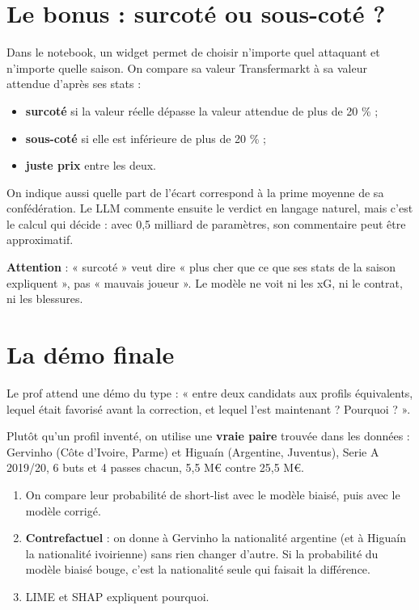\documentclass[11pt,a4paper]{article}
\begin{document}
\section{Le bonus : surcoté ou sous-coté ?}
Dans le notebook, un widget permet de choisir n'importe quel attaquant et n'importe quelle saison. On compare sa valeur Transfermarkt à sa valeur attendue d'après ses stats :
\begin{itemize}
  \item \textbf{surcoté} si la valeur réelle dépasse la valeur attendue de plus de 20 \% ;
  \item \textbf{sous-coté} si elle est inférieure de plus de 20 \% ;
  \item \textbf{juste prix} entre les deux.
\end{itemize}
On indique aussi quelle part de l'écart correspond à la prime moyenne de sa confédération. Le LLM commente ensuite le verdict en langage naturel, mais c'est le calcul qui décide : avec 0,5 milliard de paramètres, son commentaire peut être approximatif.

\textbf{Attention} : « surcoté » veut dire « plus cher que ce que ses stats de la saison expliquent », pas « mauvais joueur ». Le modèle ne voit ni les xG, ni le contrat, ni les blessures.

\section{La démo finale}
Le prof attend une démo du type : « entre deux candidats aux profils équivalents, lequel était favorisé avant la correction, et lequel l'est maintenant ? Pourquoi ? ».

Plutôt qu'un profil inventé, on utilise une \textbf{vraie paire} trouvée dans les données : Gervinho (Côte d'Ivoire, Parme) et Higuaín (Argentine, Juventus), Serie A 2019/20, 6 buts et 4 passes chacun, 5,5 M€ contre 25,5 M€.
\begin{enumerate}
  \item On compare leur probabilité de short-list avec le modèle biaisé, puis avec le modèle corrigé.
  \item \textbf{Contrefactuel} : on donne à Gervinho la nationalité argentine (et à Higuaín la nationalité ivoirienne) sans rien changer d'autre. Si la probabilité du modèle biaisé bouge, c'est la nationalité seule qui faisait la différence.
  \item LIME et SHAP expliquent pourquoi.
\end{enumerate}
\end{document}
